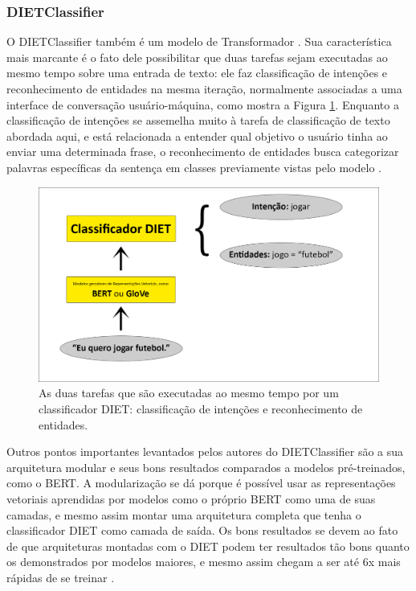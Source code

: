 \subsubsection{DIETClassifier}
O DIETClassifier \cite{diet_classifier} também é um modelo de Transformador \cite{attention_is_all_you_need}. Sua característica mais marcante é o fato dele possibilitar que duas tarefas sejam executadas ao mesmo tempo sobre uma entrada de texto: ele faz classificação de intenções e reconhecimento de entidades na mesma iteração, normalmente associadas a uma interface de conversação usuário-máquina, como mostra a Figura \ref{fig:diet_schema}. Enquanto a classificação de intenções se assemelha muito à tarefa de classificação de texto abordada aqui, e está relacionada a entender qual objetivo o usuário tinha ao enviar uma determinada frase, o reconhecimento de entidades busca categorizar palavras específicas da sentença em classes previamente vistas pelo modelo \cite{diet_blog}.

\begin{figure}[htb]
        \centering
        \includegraphics[width=14cm]{figuras/tarefas_do_DIET.png}
        \caption{As duas tarefas que são executadas ao mesmo tempo por um classificador DIET: classificação de intenções e reconhecimento de entidades.}
        \label{fig:diet_schema}
\end{figure}

Outros pontos importantes levantados pelos autores do DIETClassifier são a sua arquitetura modular e seus bons resultados comparados a modelos pré-treinados, como o BERT. A modularização se dá porque é possível usar as representações vetoriais aprendidas por modelos como o próprio BERT como uma de suas camadas, e mesmo assim montar uma arquitetura completa que tenha o classificador DIET como camada de saída. Os bons resultados se devem ao fato de que arquiteturas montadas com o DIET podem ter resultados tão bons quanto os demonstrados por modelos maiores, e mesmo assim chegam a ser até 6x mais rápidas de se treinar \cite{diet_classifier} \cite{diet_blog}.

